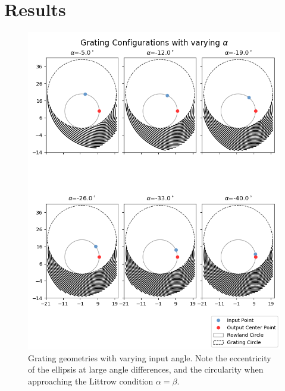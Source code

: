 \documentclass{article}
\begin{document}
    
\section{Results}


    \begin{figure}[H]        
    \centering
    \scriptsize 
    \includegraphics[width=0.9 \textwidth]{images/varied_alpha_0.png}
    \caption{\label{fig:vary_alpha} Grating geometries with varying input angle. Note the eccentricity of the ellipsis at large angle differences, and the circularity when approaching the Littrow condition $\alpha = \beta$.}
    \end{figure}
    
\end{document}
